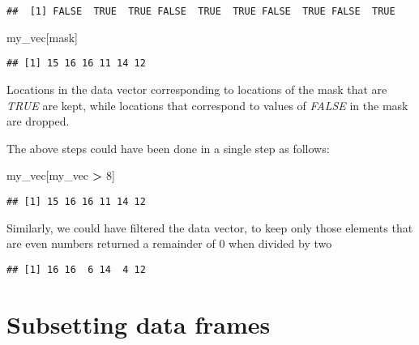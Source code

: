 \documentclass[]{book}
\newenvironment{Shaded}{\begin{snugshade}}{\end{snugshade}}
\newcommand{\DecValTok}[1]{\textcolor[rgb]{0.00,0.00,0.81}{#1}}
\newcommand{\NormalTok}[1]{#1}
\newcommand{\OperatorTok}[1]{\textcolor[rgb]{0.81,0.36,0.00}{\textbf{#1}}}
\newcommand{\StringTok}[1]{\textcolor[rgb]{0.31,0.60,0.02}{#1}}
\begin{document}
\begin{verbatim}
##  [1] FALSE  TRUE  TRUE FALSE  TRUE  TRUE FALSE  TRUE FALSE  TRUE
\end{verbatim}

\begin{Shaded}
\begin{Highlighting}[]
\NormalTok{my_vec[mask]}
\end{Highlighting}
\end{Shaded}

\begin{verbatim}
## [1] 15 16 16 11 14 12
\end{verbatim}

Locations in the data vector corresponding to locations of the mask that are \emph{TRUE} are kept, while locations that correspond to values of \emph{FALSE} in the mask are dropped.

The above steps could have been done in a single step as follows:

\begin{Shaded}
\begin{Highlighting}[]
\NormalTok{my_vec[my_vec }\OperatorTok{>}\StringTok{ }\DecValTok{8}\NormalTok{]}
\end{Highlighting}
\end{Shaded}

\begin{verbatim}
## [1] 15 16 16 11 14 12
\end{verbatim}

Similarly, we could have filtered the data vector, to keep only those elements that are even numbers returned a remainder of 0 when divided by two

\begin{Shaded}
\end{Shaded}

\begin{verbatim}
## [1] 16 16  6 14  4 12
\end{verbatim}

\hypertarget{dfsubsetbase}{%
\section*{Subsetting data frames}\label{dfsubsetbase}}
\end{document}
